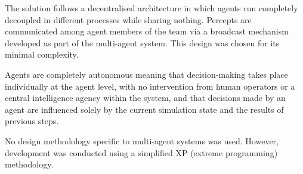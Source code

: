 \documentclass{llncs2e/llncs}
\begin{document}
    The solution follows a decentralised architecture in which agents run 
    completely decoupled in different processes while sharing nothing. Percepts 
    are communicated among agent members of the team via a broadcast mechanism 
    developed as part of the multi-agent system. This design was chosen for its 
    minimal complexity.

    Agents are completely autonomous meaning that decision-making takes place 
    individually at the agent level, with no intervention from human operators or 
    a central intelligence agency within the system, and that decisions made by an 
    agent are influenced solely by the current simulation state and the results of 
    previous steps.

    No design methodology specific to multi-agent systems was used. However, 
    development was conducted using a simplified XP (extreme programming) 
    methodology.
    

\end{document}
